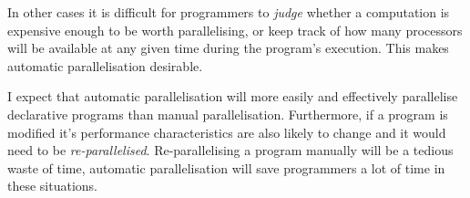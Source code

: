 In other cases it is difficult for programmers to \emph{judge} whether
a computation is expensive enough to be worth parallelising,
or keep track of how many processors will be available at any given
time during the program's execution.
This makes automatic parallelisation desirable.

I expect that automatic parallelisation will more easily and
effectively parallelise declarative programs than manual
parallelisation.
Furthermore, if a program is modified it's performance characteristics
are also likely to change and it would need to be
\emph{re-parallelised}.
Re-parallelising a program manually will be a tedious waste of time,
automatic parallelisation will save programmers a lot of time in these
situations.

